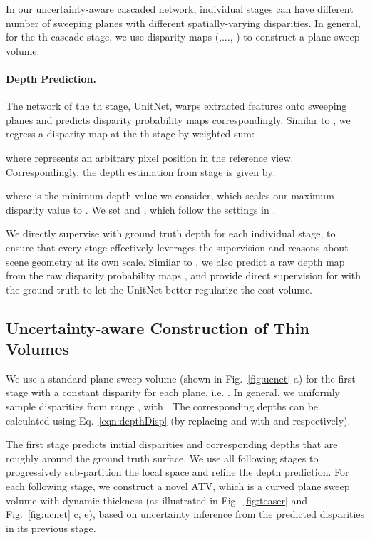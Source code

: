 {In our uncertainty-aware cascaded network, individual stages can have different number of sweeping planes with different spatially-varying disparities.
In general, for the th cascade stage, we use  disparity maps  (,..., ) to construct a plane sweep volume.

\paragraph{Depth Prediction.} The network of the th stage, UnitNet, warps extracted features onto  sweeping planes and predicts  disparity probability maps  correspondingly.
Similar to \cite{yao2018mvsnet,im2018dpsnet}, we regress a disparity map  at the th stage by weighted sum:

where  represents an arbitrary pixel position in the reference view.
Correspondingly, the depth estimation  from stage  is given by:

where  is the minimum depth value we consider, which scales our maximum disparity value to .
We set  and , which follow the settings in \cite{im2018dpsnet}.

We directly supervise  with ground truth depth for each individual stage, to ensure that every stage effectively leverages the supervision and reasons about scene geometry at its own scale. 
Similar to , we also predict
a raw depth map  from the raw disparity probability maps , and provide direct supervision for  with the ground truth to let the UnitNet better regularize the cost volume.


\subsection{Uncertainty-aware Construction of Thin Volumes}
\label{sec:uacstrct}

We use a standard plane sweep volume (shown in Fig.~\ref{fig:ucnet} a) for the first stage with a constant disparity  for each plane, i.e. .
In general, we uniformly sample  disparities  from range , with .
The corresponding depths  can be calculated using Eq.~\eqref{eqn:depthDisp} (by replacing  and  with  and  respectively).

The first stage predicts initial disparities and corresponding depths that are roughly around
the ground truth surface.
We use all following stages to progressively sub-partition the local space and refine the depth prediction.
For each following stage, we construct a novel ATV, which is a curved plane sweep volume with dynamic thickness 
(as illustrated in Fig.~\ref{fig:teaser} and Fig.~\ref{fig:ucnet} c, e), 
based on uncertainty inference from the predicted disparities in its previous stage.

}
